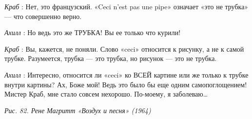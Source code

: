 \emph{Краб} : Нет, это французский. «Ceci n'est pas une pipe» означает «это не трубка» --- что совершенно верно.

\emph{Ахилл} : Но ведь это же ТРУБКА! Вы ее только что курили!

\emph{Краб} : Вы, кажется, не поняли. Слово «ceci» относится к рисунку, а не к самой трубке. Разумеется, трубка --- это трубка, но рисунок --- это не трубка.

\emph{Ахилл} : Интересно, относится ли «ceci» ко ВСЕЙ картине или же только к трубке внутри картины? Ах, Боже мой! Ведь это было бы еще одним самопоглощением! Мистер Краб, мне стало совсем нехорошо. По-моему, я заболеваю\ldots{}

\emph{Рис. 82. Рене Магритт «Воздух и песня» (1964)}


